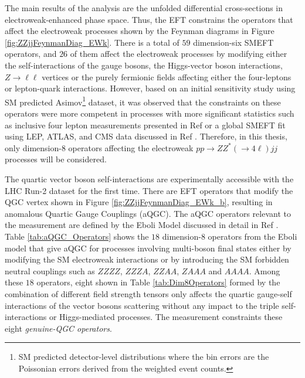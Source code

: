 The main results of the analysis are the unfolded differential cross-sections in electroweak-enhanced phase space. Thus, the EFT constrains the operators that affect the electroweak processes shown by the Feynman diagrams in Figure \ref{fig:ZZjjFeynmanDiag_EWk}. There is a total of $59$ dimension-six SMEFT operators, and $26$ of them affect the electroweak processes by modifying either the self-interactions of the gauge bosons, the Higgs-vector boson interactions, $Z \rightarrow \ell \ell$ vertices or the purely fermionic fields affecting either the four-leptons or lepton-quark interactions. However, based on an initial sensitivity study using SM predicted Asimov\footnote{SM predicted detector-level distributions where the bin errors are the Poissonian errors derived from the weighted event counts.} dataset, it was observed that the constraints on these operators were more competent in processes with more significant statistics such as inclusive four lepton measurements presented in Ref \cite{Inclusive_FourLepton} or a global SMEFT fit using LEP, ATLAS, and CMS data discussed in Ref \cite{GlobalEFT_Dim6}. Therefore, in this thesis, only dimension-8 operators affecting the electroweak $pp\rightarrow ZZ^* (\rightarrow 4 \ell) jj$ processes will be considered. 

The quartic vector boson self-interactions are experimentally accessible with the LHC Run-2 dataset for the first time. There are EFT operators that modify the QGC vertex shown in Figure \ref{fig:ZZjjFeynmanDiag_EWk_b}, resulting in anomalous Quartic Gauge Couplings (aQGC). The aQGC operators relevant to the measurement are defined by the Eboli Model discussed in detail in Ref \cite{EFT_Eboli}. Table \ref{tab:aQGC_Operators} shows the $18$ dimension-8 operators from the Eboli model that give aQGC for processes involving multi-boson final states either by modifying the SM electroweak interactions or by introducing the SM forbidden neutral couplings such as $ZZZZ$, $ZZZA$, $ZZAA$, $ZAAA$ and $AAAA$. Among these $18$ operators, eight shown in Table \ref{tab:Dim8Operators} formed by the combination of different field strength tensors only affects the quartic gauge-self interactions of the vector bosons scattering without any impact to the triple self-interactions or Higgs-mediated processes. The measurement constraints these eight \textit{genuine-QGC operators}. 

